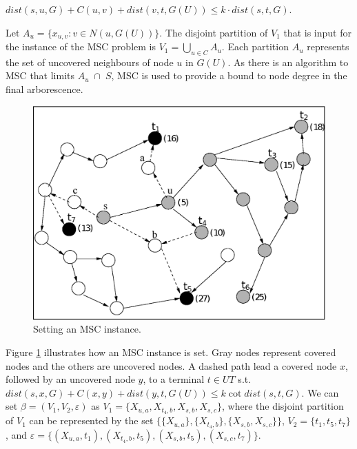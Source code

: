\begin{center}
$dist(s, u, G) + C(u, v) + dist(v,t,G(U)) \leq k \cdot dist(s,t,G)$.
\end{center}


Let $A_u = \lbrace x_{u,v} :  v \in N(u, G(U)) \rbrace$. The disjoint partition of $V_1$ that is input for the instance of the MSC problem is 
$V_1 = \bigcup_{u \in C}A_u$. Each partition $A_u$ represents the set of uncovered neighbours of node $u$ in $G(U)$. As there is an algorithm
to MSC that limits \mbox{$A_u$ $\cap$ $S$}, MSC is used to provide a bound to node degree in the final arborescence.

\begin{figure}[t]
\centering
\includegraphics[scale=0.45]{imagens/mscInstance_teste}
\caption[Setting an MSC instance]{Setting an MSC instance.}
\label{fig:mscInstance}
\end{figure}

Figure \ref{fig:mscInstance} illustrates how an MSC instance is set. Gray nodes represent covered nodes and the others are uncovered nodes. 
A dashed path lead a covered node $x$, followed by an uncovered node $y$, to a terminal $t \in UT$ s.t. $dist(s,x,G) + C(x,y) + dist(y,t,G(U)) \le k \cot dist(s,t,G)$. 
We can set $\beta=(V_1, V_2, \varepsilon)$ as $V_1 = \{ X_{u,a}, X_{t_4,b}, X_{s,b}, X_{s,c} \}$, where the disjoint partition of $V_1$ can be represented by the set $\{ \{ X_{u,a} \}, \{ X_{t_4,b} \}, \{ X_{s,b}, X_{s,c} \} \}$, 
$V_2 = \{ t_1, t_5, t_7 \}$, and $\varepsilon = \{ (X_{u,a}, t_1), (X_{t_4,b}, t_5), (X_{s,b}, t_5), (X_{s,c}, t_7) \}$.

